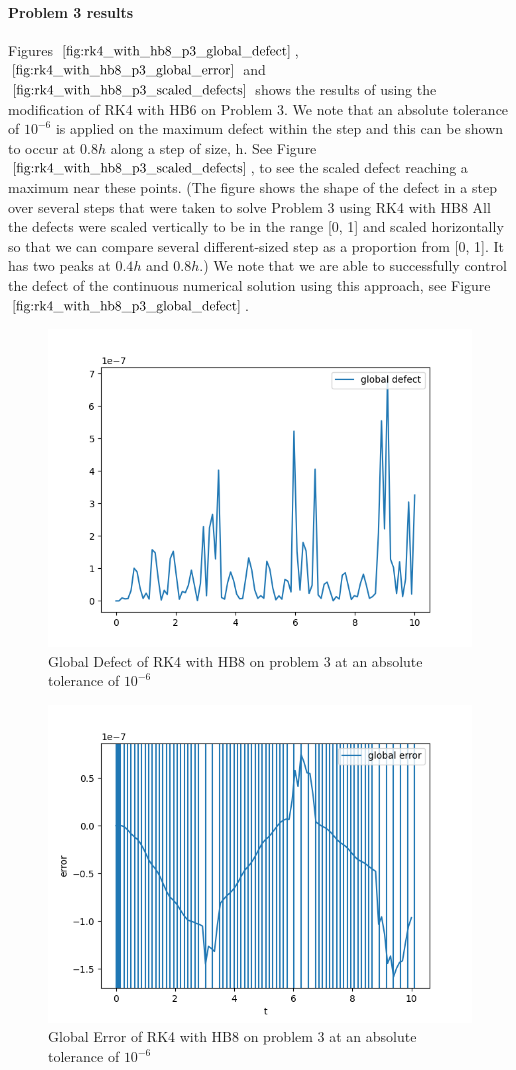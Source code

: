 \documentclass{article}
\begin{document}
\paragraph{Problem 3 results}
Figures $\ref{fig:rk4_with_hb8_p3_global_defect}$, $\ref{fig:rk4_with_hb8_p3_global_error}$ and $\ref{fig:rk4_with_hb8_p3_scaled_defects}$ shows the results of using the modification of RK4 with HB6 on Problem 3. 
We note that an absolute tolerance of $10^{-6}$ is applied on the maximum defect within the step and this can be shown to occur at $0.8h$ along a step of size, h.  See Figure $\ref{fig:rk4_with_hb8_p3_scaled_defects}$, to see the scaled defect reaching a maximum near these points. (The figure shows the shape of the defect in a step over several steps that were taken to solve Problem 3 using RK4 with HB8 All the defects were scaled vertically to be in the range [0, 1] and scaled horizontally so that we can compare several different-sized step as a proportion from [0, 1]. It has two peaks at $0.4h$ and $0.8h$.) We note that we are able to successfully control the defect of the continuous numerical solution using this approach, see Figure $\ref{fig:rk4_with_hb8_p3_global_defect}$. 

\begin{figure}[H]
\centering
\includegraphics[width=0.7\linewidth]{./figures/rk4_with_hb8_p3_global_defect}
\caption{Global Defect of RK4 with HB8 on problem 3 at an absolute tolerance of $10^{-6}$}
\label{fig:rk4_with_hb8_p3_global_defect}
\end{figure}

\begin{figure}[H]
\centering
\includegraphics[width=0.7\linewidth]{./figures/rk4_with_hb8_p3_global_error}
\caption{Global Error of RK4 with HB8 on problem 3 at an absolute tolerance of $10^{-6}$}
\label{fig:rk4_with_hb8_p3_global_error}
\end{figure}
\end{document}
